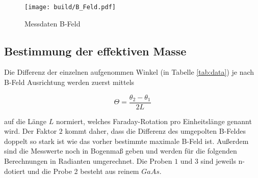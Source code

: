 \begin{figure}[H]
	\centering
	\texttt{[image: build/B\_Feld.pdf]}
	\caption{Messdaten B-Feld}\label{fig:B_Feld}
\end{figure}

\subsection{Bestimmung der effektiven Masse}
Die Differenz der einzelnen aufgenommen Winkel (in Tabelle \eqref{tab:data}) je
nach B-Feld Ausrichtung werden zuerst mittels

\begin{equation}
	\Theta =\frac{\theta_2 - \theta_1}{2L}
\end{equation}

auf die Länge $L$ normiert, welches Faraday-Rotation pro Einheitslänge genannt
wird. Der Faktor $2$ kommt daher, dass die Differenz des umgepolten B-Feldes
doppelt so stark ist wie das vorher bestimmte maximale B-Feld ist. Außerdem
sind die Messwerte noch in Bogenmaß geben und werden für die folgenden
Berechnungen in Radianten umgerechnet. Die Proben $1$ und $3$ sind jeweils
n-dotiert und die Probe 2 besteht aus reinem $GaAs$.

